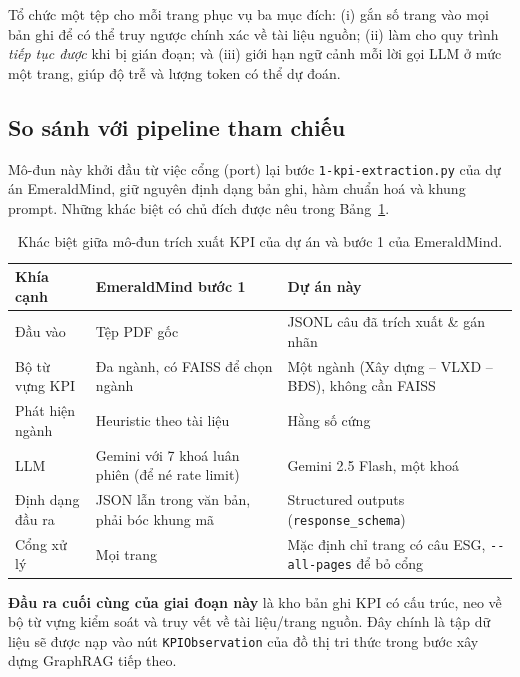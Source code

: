 \documentclass{article}
\begin{document}
Tổ chức một tệp cho mỗi trang phục vụ ba mục đích: (i) gắn số trang vào mọi bản
ghi để có thể truy ngược chính xác về tài liệu nguồn; (ii) làm cho quy trình
\textit{tiếp tục được} khi bị gián đoạn; và (iii) giới hạn ngữ cảnh mỗi lời gọi
LLM ở mức một trang, giúp độ trễ và lượng token có thể dự đoán.

\subsection{So sánh với pipeline tham chiếu}

Mô-đun này khởi đầu từ việc cổng (port) lại bước
\texttt{1-kpi-extraction.py} của dự án EmeraldMind, giữ nguyên định dạng bản
ghi, hàm chuẩn hoá và khung prompt. Những khác biệt có chủ đích được nêu trong
Bảng~\ref{tab:kpi-vs-emerald}.

\begin{table}[H]
  \centering
  \caption{Khác biệt giữa mô-đun trích xuất KPI của dự án và bước 1 của EmeraldMind.}
  \label{tab:kpi-vs-emerald}
  \begin{tabularx}{\linewidth}{l X X}
    \hline
    \textbf{Khía cạnh} & \textbf{EmeraldMind bước 1} & \textbf{Dự án này} \\
    \hline
    Đầu vào            & Tệp PDF gốc & JSONL câu đã trích xuất \& gán nhãn \\
    Bộ từ vựng KPI     & Đa ngành, có FAISS để chọn ngành & Một ngành (Xây dựng -- VLXD -- BĐS), không cần FAISS \\
    Phát hiện ngành    & Heuristic theo tài liệu & Hằng số cứng \\
    LLM                & Gemini với 7 khoá luân phiên (để né rate limit) & Gemini 2.5 Flash, một khoá \\
    Định dạng đầu ra   & JSON lẫn trong văn bản, phải bóc khung mã & Structured outputs (\texttt{response\_schema}) \\
    Cổng xử lý         & Mọi trang & Mặc định chỉ trang có câu ESG, \texttt{-{}-all-pages} để bỏ cổng \\
    \hline
  \end{tabularx}
\end{table}

\medskip
\noindent\textbf{Đầu ra cuối cùng của giai đoạn này} là kho bản ghi KPI có cấu
trúc, neo về bộ từ vựng kiểm soát và truy vết về tài liệu/trang nguồn. Đây
chính là tập dữ liệu sẽ được nạp vào nút \texttt{KPIObservation} của đồ thị tri
thức trong bước xây dựng GraphRAG tiếp theo.
\end{document}
